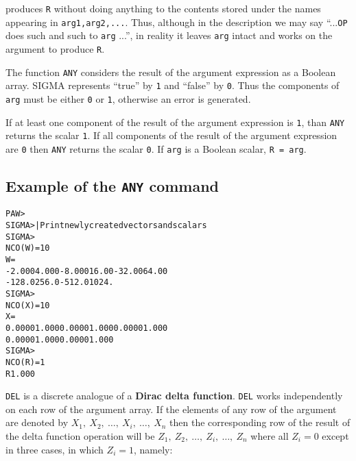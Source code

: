 
produces \texttt{R} without doing anything to the 
contents stored under the names
appearing in \texttt{arg1,arg2,...}.
Thus, although in the description we may say
``...\texttt{OP} does such and such to \texttt{arg} ...'',
in reality it leaves \texttt{arg} intact and works on
the argument to produce \texttt{R}.

 
The function \texttt{ANY} considers the result 
of the argument expression as a Boolean
array. SIGMA represents ``true'' by \texttt{1} and ``false'' by \texttt{0}.
Thus the components of \texttt{arg}
must be either \texttt{0} or \texttt{1}, otherwise an error is generated.
 
If at least one component of the result of the argument expression is \texttt{1},
than \texttt{ANY} returns the scalar \texttt{1}. If all components of the result of the argument
expression are \texttt{0} then \texttt{ANY} returns the scalar \texttt{0}.
If \texttt{arg} is a Boolean scalar, \texttt{R = arg}.

\subsection*{Example of the \texttt{ANY} command}
\begin{alltt}
  PAW > 
  SIGMA >                             | Print newly created vectors and scalars
  SIGMA > 
  NCO(W       )=   10
  W       =
   -2.000      4.000     -8.000      16.00     -32.00      64.00
   -128.0      256.0     -512.0      1024.
  SIGMA > 
  NCO(X       )=   10
  X       =
   0.0000      1.000     0.0000      1.000     0.0000      1.000
   0.0000      1.000     0.0000      1.000
  SIGMA > 
  NCO(R       )=    1
  R         1.000
\end{alltt}

 
\texttt{DEL} is a discrete analogue of a {\bf Dirac delta function}. 
\texttt{DEL} works independently
on each row of the argument array. 
If the elements of any row of the argument are denoted by
\(X_1,\:X_2,\:\dots,\:X_i,\:\ldots,\:X_n\)
then the corresponding row of the result of the delta function
operation will be 
\(Z_1,\:Z_2,\:\dots,\:Z_i,\:\ldots,\:Z_n\)
where all \(Z_i = 0\) except in three cases, 
in which \(Z_i = 1\), namely:

